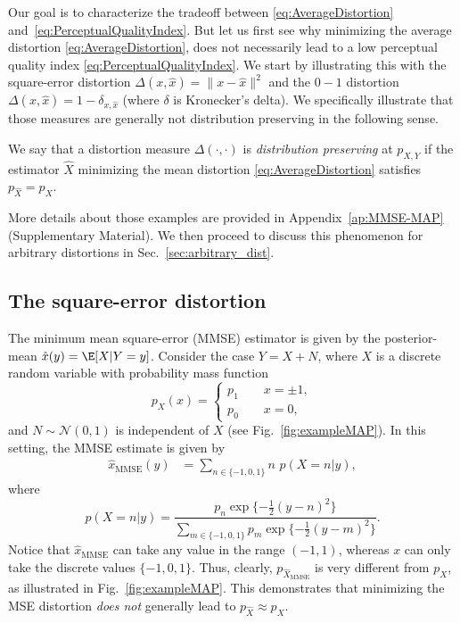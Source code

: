 Our goal is to characterize the tradeoff between \eqref{eq:AverageDistortion} and~\eqref{eq:PerceptualQualityIndex}. But let us first see why minimizing the average distortion \eqref{eq:AverageDistortion}, does not necessarily lead to a low perceptual quality index \eqref{eq:PerceptualQualityIndex}. We start by illustrating this with the square-error distortion $\Delta(x,\hat{x})=\|x-\hat{x}\|^2$ and the $0-1$ distortion $\Delta(x,\hat{x})=1-\delta_{x,\hat{x}}$ (where $\delta$ is Kronecker's delta). We specifically illustrate that those measures are generally not distribution preserving in the following sense.
\begin{definition}
We say that a distortion measure $\Delta(\cdot,\cdot)$ is \emph{distribution preserving} at $p_{X,Y}$ if the estimator $\hat{X}$ minimizing the mean distortion \eqref{eq:AverageDistortion} satisfies $p_{\hat{X}}=p_X$.
\end{definition}
More details about those examples are provided in Appendix~\ref{ap:MMSE-MAP} (Supplementary Material). We then proceed to discuss this phenomenon for arbitrary distortions in Sec.~\ref{sec:arbitrary_dist}.


\subsection{The square-error distortion}\label{subsec:MMSEMAP}
The minimum mean square-error (MMSE) estimator is given by the posterior-mean $\hat{x}(y)=\E[X|Y=y]$. Consider the case $Y=X+N$, where $X$ is a discrete random variable with probability mass function
\begin{equation}\label{eq:XdiscreteExample}
	p_X(x) =
	\begin{cases}
	p_1 \quad \quad x= \pm 1,\\
	p_0 \quad \quad x=0,
	\end{cases}
\end{equation}
and $N \sim \mathcal{N}(0,1)$ is independent of $X$ (see Fig.~\ref{fig:exampleMAP}). In this setting, the MMSE estimate is given by
\begin{align}\label{eq:xMMSE}
\hat{x}_{\text{MMSE}}(y)&= \sum_{n\in\{-1,0,1\}}n \,\,p(X=n|y),
\end{align}
where
\begin{equation}\label{eq:PosteriorDiscrete}
p(X=n|y) = \frac{p_n \exp\{-\frac{1}{2}(y-n)^2\}}{\sum_{m\in\{-1,0,1\}}\limits p_m \exp\{-\frac{1}{2}(y-m)^2\}}.
\end{equation}
Notice that $\hat{x}_{\text{MMSE}}$ can take any value in the range $(-1,1)$, whereas $x$ can only take the discrete values $\{-1,0,1\}$. Thus, clearly, $p_{\hat{X}_{\text{MMSE}}}$ is very different from $p_X$, as illustrated in Fig.~\ref{fig:exampleMAP}. This demonstrates that minimizing the MSE distortion \emph{does not} generally lead to $p_{\hat{X}}\approx p_{X}$.



